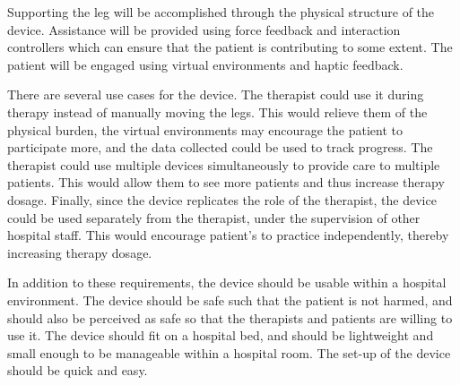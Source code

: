 \documentclass[12pt]{report}
\begin{document}
Supporting the leg will be accomplished through the physical structure of the device. Assistance will be provided using force feedback and interaction controllers which can ensure that the patient is contributing to some extent. The patient will be engaged using virtual environments and haptic feedback. 


 

There are several use cases for the device. The therapist could use it during therapy instead of manually moving the legs. This would relieve them of the physical burden, the virtual environments may encourage the patient to participate more, and the data collected could be used to track progress. The therapist could use multiple devices simultaneously to provide care to multiple patients. This would allow them to see more patients and thus increase therapy dosage. Finally, since the device replicates the role of the therapist, the device could be used separately from the therapist, under the supervision of other hospital staff. This would encourage patient's to practice independently, thereby increasing therapy dosage. 

In addition to these requirements, the device should be usable within a hospital environment. The device should be safe such that the patient is not harmed, and should also be perceived as safe so that the therapists and patients are willing to use it. The device should fit on a hospital bed, and should be lightweight and small enough to be manageable within a hospital room. The set-up of the device should be quick and easy.
\end{document}
